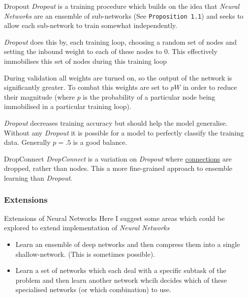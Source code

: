 \documentclass[11pt,a4paper]{article}
\begin{document}
  \begin{definition}{Dropout}
    \textit{Dropout} is a training procedure which builds on the idea that \textit{Neural Networks} are an ensemble of sub-networks (See \texttt{Proposition 1.1}) and seeks to allow each sub-network to train somewhat independently.
    \par \textit{Dropout} does this by, each training loop, choosing a random set of nodes and setting the inbound weight to each of these nodes to 0. This effectively immobilises this set of nodes during this training loop
    \par During validation all weights are turned on, so the output of the network is significantly greater. To combat this weights are set to $pW$ in order to reduce their magnitude (where $p$ is the probability of a particular node being immobilised in a particular training loop).
    \par \textit{Dropout} decreases training accuracy but should help the model generalise. Without any \textit{Dropout} it is possible for a model to perfectly classify the training data. Generally $p=.5$ is a good balance.
  \end{definition}

  \begin{definition}{DropConnect}
    \textit{DropConnect} is a variation on \textit{Dropout} where \underline{connections} are dropped, rather than nodes. This a more fine-grained approach to ensemble learning than \textit{Dropout}.
  \end{definition}

\subsubsection{Extensions} \label{sec_DNNExtensions}

  \begin{proposition}{Extensions of Neural Networks}
    Here I suggest some areas which could be explored to extend implementation of \textit{Neural Networks}
    \begin{itemize}
      \item Learn an ensemble of deep networks and then compress them into a single shallow-network. (This is sometimes possible).
      \item Learn a set of networks which each deal with a specific subtask of the problem and then learn another network whcih decides which of these specialised networks (or which combination) to use.
    \end{itemize}
  \end{proposition}
\end{document}
